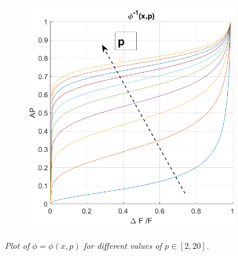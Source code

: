 \documentclass[12pt, a4paper]{report}
\begin{document}
\begin{figure}[H]
\begin{minipage}{\linewidth}
\begin{minipage}{0.45\linewidth}
\begin{figure}[H]
			\end{figure}
		\end{minipage}
		\hspace{0.05\linewidth}
		\begin{minipage}{0.45\linewidth}
			\begin{figure}[H]
				\includegraphics[width=\linewidth]{phi_inv.png}
				
			\end{figure}
		\end{minipage}
		
	\end{minipage}
	\caption{\textit{Plot of $\phi = \phi (x,p)$ for different values of $p \in [2,20]$.}}
	\label{phi}
\end{figure}
\end{document}
